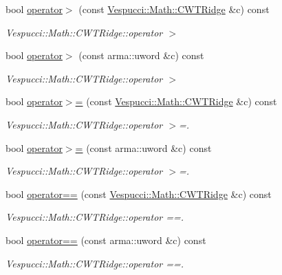 \begin{DoxyCompactItemize}
\item 
bool \hyperlink{class_vespucci_1_1_math_1_1_c_w_t_ridge_ad9b2e717baf559c451fc7b6e0fddfcbd}{operator$>$} (const \hyperlink{class_vespucci_1_1_math_1_1_c_w_t_ridge}{Vespucci\+::\+Math\+::\+C\+W\+T\+Ridge} \&c) const 
\begin{DoxyCompactList}\small\item\em Vespucci\+::\+Math\+::\+C\+W\+T\+Ridge\+::operator $>$ \end{DoxyCompactList}\item 
bool \hyperlink{class_vespucci_1_1_math_1_1_c_w_t_ridge_a053f837ad1640d3143c3675a16d72c46}{operator$>$} (const arma\+::uword \&c) const 
\begin{DoxyCompactList}\small\item\em Vespucci\+::\+Math\+::\+C\+W\+T\+Ridge\+::operator $>$ \end{DoxyCompactList}\item 
bool \hyperlink{class_vespucci_1_1_math_1_1_c_w_t_ridge_a020e681df39ba838dc0588fdc6ee3895}{operator$>$=} (const \hyperlink{class_vespucci_1_1_math_1_1_c_w_t_ridge}{Vespucci\+::\+Math\+::\+C\+W\+T\+Ridge} \&c) const 
\begin{DoxyCompactList}\small\item\em Vespucci\+::\+Math\+::\+C\+W\+T\+Ridge\+::operator $>$=. \end{DoxyCompactList}\item 
bool \hyperlink{class_vespucci_1_1_math_1_1_c_w_t_ridge_ac1e298f436a5e977143fd78573e126ee}{operator$>$=} (const arma\+::uword \&c) const 
\begin{DoxyCompactList}\small\item\em Vespucci\+::\+Math\+::\+C\+W\+T\+Ridge\+::operator $>$=. \end{DoxyCompactList}\item 
bool \hyperlink{class_vespucci_1_1_math_1_1_c_w_t_ridge_a374339ea2cbbbf03e78a53ca8cfe741d}{operator==} (const \hyperlink{class_vespucci_1_1_math_1_1_c_w_t_ridge}{Vespucci\+::\+Math\+::\+C\+W\+T\+Ridge} \&c) const 
\begin{DoxyCompactList}\small\item\em Vespucci\+::\+Math\+::\+C\+W\+T\+Ridge\+::operator ==. \end{DoxyCompactList}\item 
bool \hyperlink{class_vespucci_1_1_math_1_1_c_w_t_ridge_ad8164e7705008bb5ea1d59590f9b335d}{operator==} (const arma\+::uword \&c) const 
\begin{DoxyCompactList}\small\item\em Vespucci\+::\+Math\+::\+C\+W\+T\+Ridge\+::operator ==. \end{DoxyCompactList}\item 

\end{DoxyCompactItemize}
